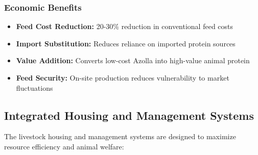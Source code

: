 \subsubsection{Economic Benefits}
\begin{itemize}
    \item \textbf{Feed Cost Reduction:} 20-30\% reduction in conventional feed costs
    \item \textbf{Import Substitution:} Reduces reliance on imported protein sources
    \item \textbf{Value Addition:} Converts low-cost Azolla into high-value animal protein
    \item \textbf{Feed Security:} On-site production reduces vulnerability to market fluctuations
\end{itemize}

\subsection{Integrated Housing and Management Systems}

The livestock housing and management systems are designed to maximize resource efficiency and animal welfare:

